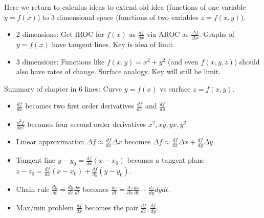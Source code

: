 \documentclass{article}
\begin{document}
Here we return to calculus ideas to extend old idea (functions of one variable $y=f(x)$) to 3 dimensional space (functions of two variables $z=f(x,y)$).
\begin{itemize}
\item 2 dimensions: Get IROC for $f(x)$ as $\frac{df}{dx}$ via AROC as $\frac{\Delta f}{\Delta x}$. Graphs of $y=f(x)$ have tangent lines. Key is idea of limit.
\item 3 dimensions: Functions like $f(x,y)=x^2+y^2$ (and even $f(x,y,z)$) should also have rates of change. Surface analogy. Key will still be limit.
\end{itemize}
Summary of chapter in 6 lines: Curve $y=f(x)$ vs surface $z=f(x,y)$.
\begin{itemize}
\item $\frac{df}{dx}$ becomes two first order derivatives $\frac{df}{dx}$ and $\frac{df}{dy}$
\item $\frac{d^2f}{dx^2}$ becomes four second order derivatives $x^2,xy,yx, y^2$
\item Linear approximation $\Delta f \approx \frac{df}{dx} \Delta x $ becomes $\Delta f \approx  \frac{df}{dx} \Delta x +  \frac{df}{dy} \Delta y$
\item Tangent line $y-y_0 = \frac{df}{dx}(x-x_0)$ becomes a tangent plane $z-z_0 = \frac{df}{dx}(x-x_0)+\frac{df}{dy}(y-y_0)$.
\item Chain rule $\frac{dy}{dt} = \frac{dy}{dx}\frac{dx}{dt}$ becomes $\frac{dz}{dt} = \frac{dz}{dx}\frac{dx}{dt}+\frac{dz}{dy}{dy}{dt}$.
\item Max/min problem $\frac{df}{dx}$ becomes the pair $\frac{df}{dx}, \frac{df}{dy}$.
\end{itemize}
\end{document}
